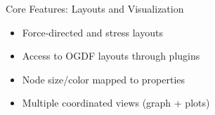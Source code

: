 \begin{frame}{Core Features: Layouts and Visualization}
	\begin{itemize}
		\item Force‑directed and stress layouts
		\item Access to OGDF layouts through plugins
		\item Node size/color mapped to properties
		\item Multiple coordinated views (graph + plots)
	\end{itemize}
\end{frame}